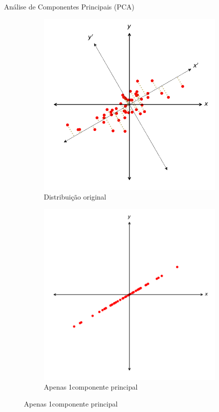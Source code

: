 \begin{frame}{Análise de Componentes Principais (PCA)}
\begin{figure}[htbp]
    \label{fig:pca}
    \begin{subfigure}[t]{0.48\textwidth}
    \caption{Distribuição original}
    \centering
    \includegraphics[width=\textwidth]{imagens/pca1.pdf}
    \end{subfigure}
    \begin{subfigure}[t]{0.48\textwidth}
    \caption{Apenas 1\textordmasculine componente principal}
    \centering
    \includegraphics[width=\textwidth]{imagens/pca2.pdf}
    \end{subfigure}
\end{figure}
\end{frame}

